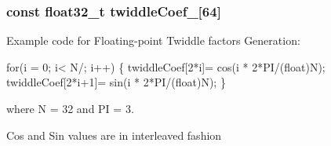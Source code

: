 \subsubsection[{\texorpdfstring{twiddle\+Coef\+\_\+32}{twiddleCoef_32}}]{\setlength{\rightskip}{0pt plus 5cm}const float32\+\_\+t twiddle\+Coef\+\_\mbox{[}64\mbox{]}}\hypertarget{group__CFFT__CIFFT_ga78a72c85d88185de98050c930cfc76e3}{}\label{group__CFFT__CIFFT_ga78a72c85d88185de98050c930cfc76e3}
\begin{DoxyParagraph}{}
Example code for Floating-\/point Twiddle factors Generation\+: 
\end{DoxyParagraph}
\begin{DoxyParagraph}{}

\begin{DoxyPre}for(i = 0; i< N/; i++)
\{
  twiddleCoef[2*i]= cos(i * 2*PI/(float)N);
  twiddleCoef[2*i+1]= sin(i * 2*PI/(float)N);
\} \end{DoxyPre}
 
\end{DoxyParagraph}
\begin{DoxyParagraph}{}
where N = 32 and PI = 3. 
\end{DoxyParagraph}
\begin{DoxyParagraph}{}
Cos and Sin values are in interleaved fashion 
\end{DoxyParagraph}
